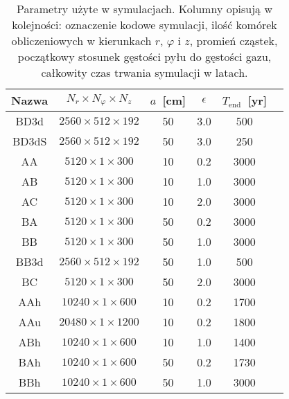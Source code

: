 \begin{table}
   \centering
   \begin{tabular}{cccccc}
      \hline
      Nazwa & $N_r \times N_\varphi \times N_z$ &
      $a$~[cm] & $\epsilon$ & $T_\textrm{end}$~[yr] \\
      \hline
      BD3d  &  $2560  \times 512 \times 192$  & 50  & 3.0 & 500  \\
      BD3dS &  $2560  \times 512 \times 192$  & 50  & 3.0 & 250  \\
      AA    &  $5120  \times 1   \times 300$  & 10  & 0.2 & 3000 \\
      AB    &  $5120  \times 1   \times 300$  & 10  & 1.0 & 3000 \\
      AC    &  $5120  \times 1   \times 300$  & 10  & 2.0 & 3000 \\
      BA    &  $5120  \times 1   \times 300$  & 50  & 0.2 & 3000 \\
      BB    &  $5120  \times 1   \times 300$  & 50  & 1.0 & 3000 \\
      BB3d  &  $2560  \times 512 \times 192$  & 50  & 1.0 & 500  \\
      BC    &  $5120  \times 1   \times 300$  & 50  & 2.0 & 3000 \\
      AAh   &  $10240 \times 1   \times 600$  & 10  & 0.2 & 1700 \\
      AAu   &  $20480 \times 1   \times 1200$ & 10  & 0.2 & 1800 \\
      ABh   &  $10240 \times 1   \times 600$  & 10  & 1.0 & 1400 \\
      BAh   &  $10240 \times 1   \times 600$  & 50  & 0.2 & 1730 \\
      BBh   &  $10240 \times 1   \times 600$  & 50  & 1.0 & 3000 \\
      \hline
   \end{tabular}
\caption{Parametry użyte w symulacjach. Kolumny opisują w kolejności: oznaczenie
   kodowe symulacji, ilość komórek obliczeniowych w kierunkach $r$, $\varphi$ i
   $z$, promień cząstek, początkowy stosunek gęstości pyłu do gęstości gazu,
całkowity czas trwania symulacji w latach.}
\label{tab1}
\end{table}

